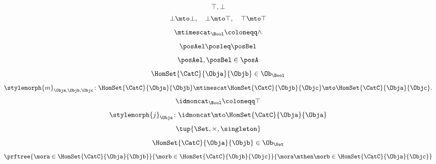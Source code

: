 {\begin{forslides}
        \begin{equation*}
            \label{eq:poset_bool_b}
            \top,\bot
        \end{equation*}
        \begin{equation*}
            \label{eq:poset_bool_c}
            \bot\mto \bot, \quad \bot\mto \top, \quad \top\mto \top
        \end{equation*}
        \begin{equation*}
            \label{eq:poset_bool_d}
            \mtimescat_\Bool \coloneqq \wedge
        \end{equation*}
        \begin{equation*}
            \label{eq:poset_bool_e}
            \posAel\posleq \posBel
        \end{equation*}
        \begin{equation*}
            \label{eq:poset_bool_f}
            \posAel,\posBel \in \posA
        \end{equation*}
        \begin{equation*}
            \label{eq:poset_bool_g}
            \HomSet{\CatC}{\Obja}{\Objb}\in \Ob_\Bool
        \end{equation*}
        \begin{equation*}
            \label{eq:poset_bool_h}
            \stylemorph{m}_{\Obja,\Objb,\Objc}\colon \HomSet{\CatC}{\Obja}{\Objb}\mtimescat \HomSet{\CatC}{\Objb}{\Objc}\mto \HomSet{\CatC}{\Obja}{\Objc}.
        \end{equation*}
        \begin{equation*}
            \label{eq:poset_bool_i}
            \idmoncat_\Bool \coloneqq \top
        \end{equation*}
        \begin{equation*}
            \label{eq:poset_bool_k}
            \stylemorph{j}_\Obja\colon \idmoncat \mto \HomSet{\CatC}{\Obja}{\Obja}
        \end{equation*}
        \begin{equation*}
            \label{eq:poset_bool_j}
            \tup{\Set, \times, \singleton}
        \end{equation*}
        \begin{equation*}
            \label{eq:poset_bool_l}
            \HomSet{\CatC}{\Obja}{\Objb}\in \Ob_\Set
        \end{equation*}
        \begin{equation*}
            \label{eq:poset_bool_m}
            \prftree{\mora \in \HomSet{\CatC}{\Obja}{\Objb}}{\morb \in \HomSet{\CatC}{\Objb}{\Objc}}{{\mora\mthen \morb \in \HomSet{\CatC}{\Obja}{\Objc}}}

\end{equation*}
\end{forslides}}
